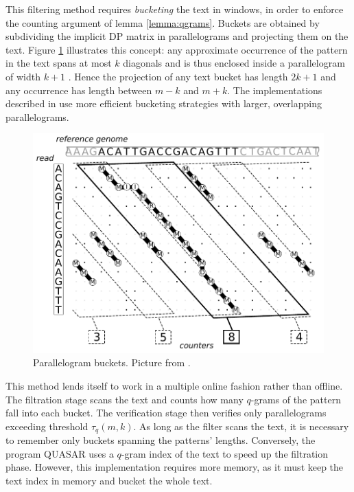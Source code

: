 This filtering method requires \emph{bucketing} the text in windows, in order to enforce the counting argument of lemma \ref{lemma:qgrams}.
Buckets are obtained by subdividing the implicit DP matrix in parallelograms and projecting them on the text.
Figure \ref{fig:swift} illustrates this concept: any approximate occurrence of the pattern in the text spans at most $k$ diagonals and is thus enclosed inside a parallelogram of width $k+1$ \citep{Rasmussen2006}.
Hence the projection of any text bucket has length $2k + 1$ and any occurrence has length between $m - k$ and $m + k$.
The implementations described in \citep{Rasmussen2006, Kehr2011, Weese2009} use more efficient bucketing strategies with larger, overlapping parallelograms.

\begin{figure}[h]
\begin{center}
\caption[Parallelogram buckets] {Parallelogram buckets. Picture from \citep{Weese2009}.}
\label{fig:swift}
\includegraphics[scale=0.75]{figures/swift.pdf}
\end{center}
\end{figure}

This method lends itself to work in a multiple online fashion rather than offline.
The filtration stage scans the text and counts how many $q$-grams of the pattern fall into each bucket.
The verification stage then verifies only parallelograms exceeding threshold $\tau_q(m,k)$.
As long as the filter scans the text, it is necessary to remember only buckets spanning the patterns' lengths.
Conversely, the program QUASAR \citep{Burkhardt1999} uses a $q$-gram index of the text to speed up the filtration phase.
However, this implementation requires more memory, as it must keep the text index in memory and bucket the whole text.

